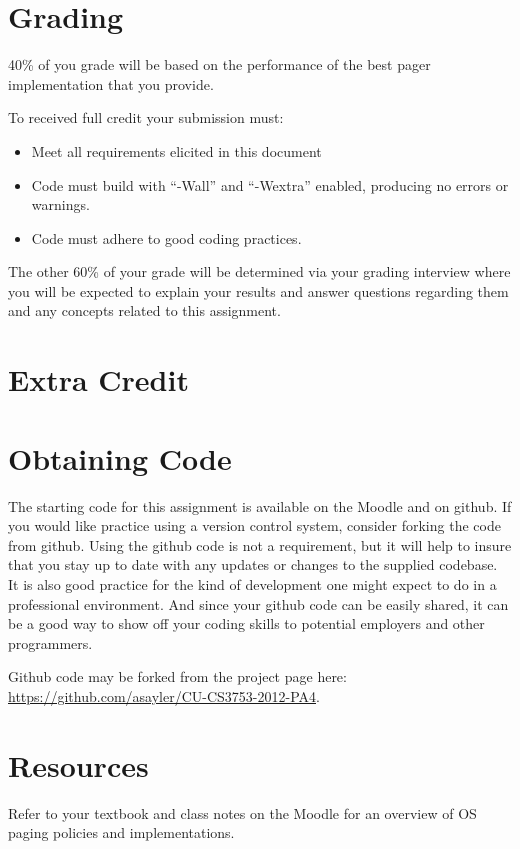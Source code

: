 \documentclass[12pt]{article}
\begin{document}
\section{Grading}

40\% of you grade will be based on the performance of the
best pager implementation that you provide.



To received full credit your submission must:
\begin{itemize}
\item Meet all requirements elicited in this document
\item Code must build with ``-Wall'' and ``-Wextra'' enabled,
  producing no errors or warnings.
\item Code must adhere to good coding practices.
\end{itemize}

The other 60\% of your grade will be determined via your grading
interview where you will be expected to explain your results and answer
questions regarding them and any concepts related to this assignment.

\section{Extra Credit}

\section{Obtaining Code}
The starting code for this assignment is available on the Moodle and
on github. If you would like practice using a version control system,
consider forking the code from github. Using the github code is not
a requirement, but it will help to insure that you stay up to date
with any updates or changes to the supplied codebase. It is also
good practice for the kind of development one might expect to do in
a professional environment. And since your github code can be easily
shared, it can be a good way to show off your coding skills to
potential employers and other programmers.

Github code may be forked from the project page here:\\
\url{https://github.com/asayler/CU-CS3753-2012-PA4}.

\section{Resources}
Refer to your textbook and class notes on the Moodle for an overview
of OS paging policies and implementations.
\end{document}
